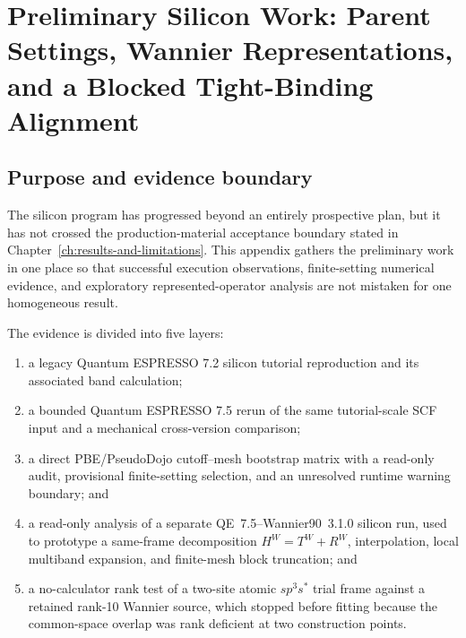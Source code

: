 \chapter{Preliminary Silicon Work: Parent Settings, Wannier Representations, and a Blocked Tight-Binding Alignment}

\label{app:preliminary-silicon-work}


\section{Purpose and evidence boundary}

The silicon program has progressed beyond an entirely prospective plan, but it
has not crossed the production-material acceptance boundary stated in
Chapter~\ref{ch:results-and-limitations}. This appendix gathers the preliminary
work in one place so that successful execution observations, finite-setting
numerical evidence, and exploratory represented-operator analysis are not
mistaken for one homogeneous result.

The evidence is divided into five layers:

\begin{enumerate}
  \item a legacy Quantum ESPRESSO 7.2 silicon tutorial reproduction and its
        associated band calculation;
  \item a bounded Quantum ESPRESSO 7.5 rerun of the same tutorial-scale SCF
        input and a mechanical cross-version comparison;
  \item a direct PBE/PseudoDojo cutoff--mesh bootstrap matrix with a read-only
        audit, provisional finite-setting selection, and an unresolved runtime
        warning boundary; and
  \item a read-only analysis of a separate QE~7.5--Wannier90~3.1.0 silicon run,
        used to prototype a same-frame decomposition
        $H^W=T^W+R^W$, interpolation, local multiband expansion, and
        finite-mesh block truncation; and
  \item a no-calculator rank test of a two-site atomic $sp^3s^{\ast}$ trial
        frame against a retained rank-10 Wannier source, which stopped before
        fitting because the common-space overlap was rank deficient at two
        construction points.
\end{enumerate}

